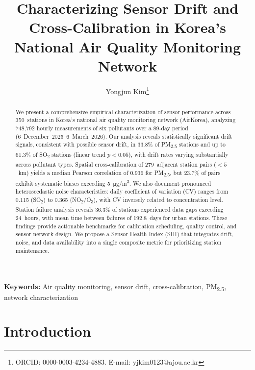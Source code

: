 \documentclass[12pt]{article}
\begin{document}
\title{Characterizing Sensor Drift and Cross-Calibration in Korea's National Air Quality Monitoring Network}

\author[1]{Yongjun Kim\thanks{ORCID: 0000-0003-4234-4883. E-mail: yjkim0123@ajou.ac.kr}}

\date{}

\maketitle

\begin{abstract}
We present a comprehensive empirical characterization of sensor performance across 350~stations in Korea's national air quality monitoring network (AirKorea), analyzing 748{,}792 hourly measurements of six pollutants over a 89-day period (6~December~2025--6~March~2026). Our analysis reveals statistically significant drift signals, consistent with possible sensor drift, in 33.8\% of PM\textsubscript{2.5} stations and up to 61.3\% of SO\textsubscript{2} stations (linear trend $p < 0.05$), with drift rates varying substantially across pollutant types. Spatial cross-calibration of 279~adjacent station pairs (${<}5$~km) yields a median Pearson correlation of 0.936 for PM\textsubscript{2.5}, but 23.7\% of pairs exhibit systematic biases exceeding \SI{5}{\micro\gram/\meter\cubed}. We also document pronounced heteroscedastic noise characteristics: daily coefficient of variation (CV) ranges from 0.115 (SO\textsubscript{2}) to 0.365 (NO\textsubscript{2}/O\textsubscript{3}), with CV inversely related to concentration level. Station failure analysis reveals 36.3\% of stations experienced data gaps exceeding 24~hours, with mean time between failures of 192.8~days for urban stations. These findings provide actionable benchmarks for calibration scheduling, quality control, and sensor network design. We propose a Sensor Health Index (SHI) that integrates drift, noise, and data availability into a single composite metric for prioritizing station maintenance.
\end{abstract}

\noindent\textbf{Keywords:} Air quality monitoring, sensor drift, cross-calibration, PM\textsubscript{2.5}, network characterization



\section{Introduction}
\end{document}
